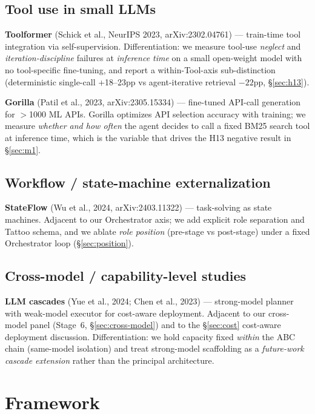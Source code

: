 \documentclass[11pt]{article}
\begin{document}
\subsection{Tool use in small LLMs}
\textbf{Toolformer} (Schick et al., NeurIPS 2023, arXiv:2302.04761) --- train-time tool integration via self-supervision. Differentiation: we measure tool-use \emph{neglect} and \emph{iteration-discipline} failures at \emph{inference time} on a small open-weight model with no tool-specific fine-tuning, and report a within-Tool-axis sub-distinction (deterministic single-call +18--23pp vs agent-iterative retrieval $-22$pp, \S\ref{sec:h13}).
\par\smallskip
\textbf{Gorilla} (Patil et al., 2023, arXiv:2305.15334) --- fine-tuned API-call generation for $>$1000 ML APIs. Gorilla optimizes API selection accuracy with training; we measure \emph{whether and how often} the agent decides to call a fixed BM25 search tool at inference time, which is the variable that drives the H13 negative result in \S\ref{sec:m1}.

\subsection{Workflow / state-machine externalization}
\textbf{StateFlow} (Wu et al., 2024, arXiv:2403.11322) --- task-solving as state machines. Adjacent to our Orchestrator axis; we add explicit role separation and Tattoo schema, and we ablate \emph{role position} (pre-stage vs post-stage) under a fixed Orchestrator loop (\S\ref{sec:position}).

\subsection{Cross-model / capability-level studies}
\textbf{LLM cascades} (Yue et al., 2024; Chen et al., 2023) --- strong-model planner with weak-model executor for cost-aware deployment. Adjacent to our cross-model panel (Stage~6, \S\ref{sec:cross-model}) and to the \S\ref{sec:cost} cost-aware deployment discussion. Differentiation: we hold capacity fixed \emph{within} the ABC chain (same-model isolation) and treat strong-model scaffolding as a \emph{future-work cascade extension} rather than the principal architecture.

\section{Framework}
\end{document}

